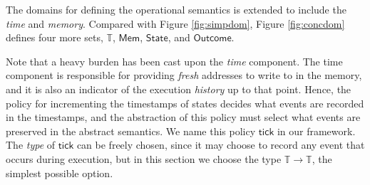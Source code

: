 \documentclass[acmsmall,screen,review]{acmart}\settopmatter{printfolios=true,printccs=false,printacmref=false}
\theoremstyle{acmdefinition}
\newcommand*{\Time}{\mathbb{T}}
\newcommand*{\Mem}{\mathsf{Mem}}
\newcommand*{\State}{\mathsf{State}}
\newcommand*{\Outcome}{\mathsf{Outcome}}
\newcommand*{\tick}{\mathsf{tick}}
\begin{document}
The domains for defining the operational semantics is extended to include the \emph{time} and \emph{memory}.
Compared with Figure \ref{fig:simpdom}, Figure \ref{fig:concdom} defines four more sets, $\Time$, $\Mem$, $\State$, and $\Outcome$.

Note that a heavy burden has been cast upon the \emph{time} component.
The time component is responsible for providing \emph{fresh} addresses to write to in the memory, and it is also an indicator of the execution \emph{history} up to that point.
Hence, the policy for incrementing the timestamps of states decides what events are recorded in the timestamps, and the abstraction of this policy must select what events are preserved in the abstract semantics.
We name this policy $\tick$ in our framework.
The \emph{type} of $\tick$ can be freely chosen, since it may choose to record any event that occurs during execution, but in this section we choose the type $\Time\rightarrow\Time$, the simplest possible option.
\end{document}

